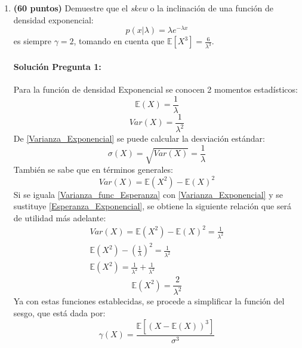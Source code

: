 \documentclass[spanish]{article}
\begin{document}
\begin{enumerate}
\item \textbf{(60 puntos)} Demuestre que el \emph{skew }o la inclinaci\'{o}n
de una funci\'{o}n de densidad exponencial:
\[
p\left(x|\lambda\right)=\lambda e^{-\lambda x}
\]
es siempre $\gamma=2$, tomando en cuenta que $\mathbb{E}\left[X^{3}\right]=\frac{6}{\lambda^{3}}$.

\paragraph{Soluci\'{o}n Pregunta 1:}
Para la funci\'{o}n de densidad Exponencial se conocen 2 momentos estad\'{i}sticos:
\begin{equation} \label{Esperanza_Exponencial}
\mathbb{E}(X) = \frac{1}{\lambda} 
\end{equation}
\begin{equation} \label{Varianza_Exponencial}
Var(X) = \frac{1}{\lambda^2} 
\end{equation}
De \ref{Varianza_Exponencial} se puede calcular la desviaci\'{o}n est\'{a}ndar:
\begin{equation} \label{STD_Exponencial}
\sigma(X)=\sqrt{Var(X)}=\frac{1}{\lambda} 
\end{equation}
Tambi\'{e}n se sabe que en t\'{e}rminos generales:
\begin{equation} \label{Varianza_func_Esperanza}
Var(X) = \mathbb{E}(X^2)-\mathbb{E}(X)^2
\end{equation}
Si se iguala \ref{Varianza_func_Esperanza} con \ref{Varianza_Exponencial} y se sustituye \ref{Esperanza_Exponencial}, se obtiene la siguiente relaci\'{o}n que ser\'{a} de utilidad m\'{a}s adelante:
\begin{gather*}
    Var(X) = \mathbb{E}(X^2)-\mathbb{E}(X)^2 = \frac{1}{\lambda^2}\\
    \mathbb{E}(X^2)-\left(\frac{1}{\lambda}\right)^2 = \frac{1}{\lambda^2}\\
    \mathbb{E}(X^2)=\frac{1}{\lambda^2} + \frac{1}{\lambda^2}
\end{gather*}
\begin{equation} \label{Esperanza_Xcuadrado_Exponencial}
\mathbb{E}(X^2)=\frac{2}{\lambda^2}
\end{equation}
Ya con estas funciones establecidas, se procede a simplificar la funci\'{o}n del sesgo, que est\'{a} dada por:
\begin{equation} \label{Skewness}
\gamma(X) =\frac{\mathbb{E}\left[(X-\mathbb{E}(X))^3\right]}{\sigma^{3}} 
\end{equation}

\end{enumerate}
\end{document}
